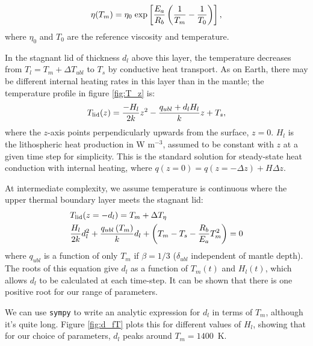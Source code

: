 \documentclass[10pt,a4paper]{article}
\begin{document}
\begin{equation}
\eta(T_m) = \eta_0 \; {\rm exp}\left[\frac{E_a}{R_b}\left(\frac{1}{T_m} - \frac{1}{T_0}\right)\right],
\end{equation}
where $\eta_0$ and $T_0$ are the reference viscosity and temperature.

In the stagnant lid of thickness $d_l$ above this layer, the temperature decreases from $T_l = T_m + \Delta T_{ubl}$ to $T_s$ by conductive heat transport. As on Earth, there may be different internal heating rates in this layer than in the mantle; the temperature profile in figure \ref{fig:T_z} is:
\begin{equation}
T_{\rm lid}(z) = \frac{-H_l}{2k}z^2 - \frac{q_{ubl} +d_l H_l}{k}z + T_s,
\end{equation}
where the $z$-axis points perpendicularly upwards from the surface, $z=0$. $H_l$ is the lithospheric heat production in W m$^{-3}$, assumed to be constant with $z$ at a given time step for simplicity. This is the standard solution for steady-state heat conduction with internal heating, where $q(z=0) = q(z=-\Delta z) + H \Delta z$.


At intermediate complexity, we assume temperature is continuous where the upper thermal boundary layer meets the stagnant lid:
\begin{align}
\label{eq:t-continuity}
&T_{\rm lid}(z=-d_l) = T_m + \Delta T_\eta \\
&\frac{H_l}{2k}d_l^2 + \frac{q_{ubl}\left(T_m\right)}{k}d_l + \left(T_m - T_s - \frac{R_b}{E_a}T_m^2\right)  = 0
\end{align}
where $q_{ubl}$ is a function of only $T_m$ if $\beta=1/3$ ($\delta_{ubl}$ independent of mantle depth). The roots of this equation give $d_l$ as a function of $T_m(t)$ and $H_l(t)$, which allows $d_l$ to be calculated at each time-step. It can be shown that there is one positive root for our range of parameters.

We can use {\tt sympy} to write an analytic expression for $d_l$ in terms of $T_m$, although it's quite long. Figure \ref{fig:d_fT} plots this for different values of $H_l$, showing that for our choice of parameters, $d_l$ peaks around $T_m = 1400$~K.
\end{document}
